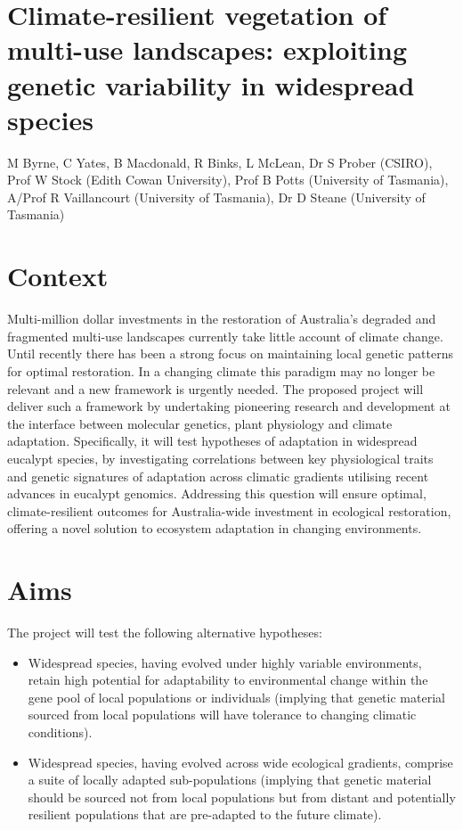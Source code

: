 \documentclass[version=last,
    paper=a4, %
    10pt, %
    usenames,
    dvipsnames,
    oneside, %
    headings=openany, %
    DIV=15 %
]{scrbook}
\begin{document}
\section*{Climate-resilient vegetation of multi-use landscapes: exploiting genetic
variability in widespread species
}

M Byrne, C Yates, B Macdonald, R Binks, L McLean, Dr S Prober (CSIRO),
Prof W Stock (Edith Cowan University), Prof B Potts (University of
Tasmania), A/Prof R Vaillancourt (University of Tasmania), Dr D Steane
(University of Tasmania)


\section*{Context}
Multi-million dollar investments in the restoration of Australia's
degraded and fragmented multi-use landscapes currently take little
account of climate change. Until recently there has been a strong focus
on maintaining local genetic patterns for optimal restoration. In a
changing climate this paradigm may no longer be relevant and a new
framework is urgently needed. The proposed project will deliver such a
framework by undertaking pioneering research and development at the
interface between molecular genetics, plant physiology and climate
adaptation. Specifically, it will test hypotheses of adaptation in
widespread eucalypt species, by investigating correlations between key
physiological traits and genetic signatures of adaptation across
climatic gradients utilising recent advances in eucalypt genomics.
Addressing this question will ensure optimal, climate-resilient outcomes
for Australia-wide investment in ecological restoration, offering a
novel solution to ecosystem adaptation in changing environments.



\section*{Aims}
The project will test the following alternative hypotheses:

\begin{itemize}
\itemsep1pt\parskip0pt
\item
  Widespread species, having evolved under highly variable environments,
  retain high potential for adaptability to environmental change within
  the gene pool of local populations or individuals (implying that
  genetic material sourced from local populations will have tolerance to
  changing climatic conditions).
\item
  Widespread species, having evolved across wide ecological gradients,
  comprise a suite of locally adapted sub-populations (implying that
  genetic material should be sourced not from local populations but from
  distant and potentially resilient populations that are pre-adapted to
  the future climate).
\end{itemize}
\end{document}
